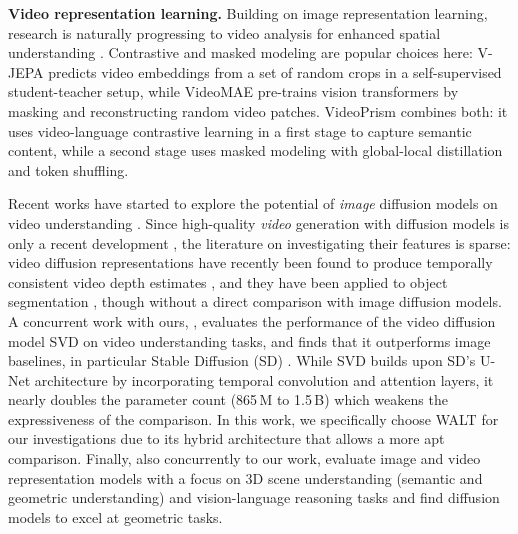 \noindent \textbf{Video representation learning.} Building on image representation learning, research is naturally progressing to video analysis for enhanced spatial understanding \cite{parthasarathy2023self}.
Contrastive and masked modeling are popular choices here:
V-JEPA \cite{vjepa} predicts video embeddings from a set of random crops in a self-supervised student-teacher setup, while VideoMAE \cite{tong2022videomae, feichtenhofer2022masked, videomaev2} pre-trains vision transformers by masking and reconstructing random video patches.
VideoPrism \cite{zhao2024} combines both: it uses video-language contrastive learning in a first stage to capture semantic content, while a second stage uses masked modeling with global-local distillation and token shuffling.

Recent works have started to explore the potential of \emph{image} diffusion models on video understanding \cite{chen2023, nag2023}.
Since high-quality \emph{video} generation with diffusion models is only a recent development \cite{walt, liu2024sora}, the literature on investigating their features is sparse:
video diffusion representations have recently been found to produce temporally consistent video depth estimates \cite{hu2024depthcrafter}, and they have been applied to object segmentation \citet{zhu2024}, though without a direct comparison with image diffusion models.
A concurrent work with ours, \cite{anonymous2024}, evaluates the performance of the video diffusion model SVD \cite{blattmann2023stable} on video understanding tasks, and finds that it outperforms image baselines, in particular Stable Diffusion (SD) \cite{rombach2022high}.
While SVD builds upon SD's U-Net architecture by incorporating temporal convolution and attention layers, it nearly doubles the parameter count (865\,M to 1.5\,B) which weakens the expressiveness of the comparison.
In this work, we specifically choose WALT \cite{walt} for our investigations due to its hybrid architecture that allows a more apt comparison.
Finally, also concurrently to our work, \citet{man2024} evaluate image and video representation models with a focus on 3D scene understanding (semantic and geometric understanding) and vision-language reasoning tasks and find
diffusion models to excel at geometric tasks.


